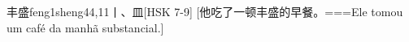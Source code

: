 \begin{EntryWithPhonetic}{丰盛}{feng1sheng4}{4,11}{⼁、⽫}[HSK 7-9]
  [他吃了一顿丰盛的早餐。===Ele tomou um café da manhã substancial.]
\end{EntryWithPhonetic}
